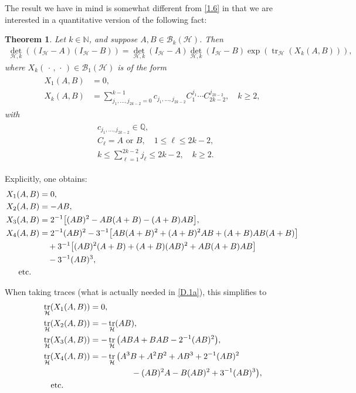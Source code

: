 \documentclass[reqno,10pt,centertags]{amsart}
\newcommand{\bbN}{{\mathbb{N}}}
\newcommand{\bbQ}{{\mathbb{Q}}}
\newcommand{\cB}{{\mathcal B}}
\newcommand{\cH}{{\mathcal H}}
\DeclareMathOperator{\tr}{tr}
\newcommand{\dott}{\,\cdot\,}
\newcommand{\no}{\notag}
\newcommand{\lb}{\label}
\let\geq\geqslant
\let\leq\leqslant
\numberwithin{equation}{section}
\newtheorem{theorem}{Theorem}[section]
\theoremstyle{remark}
\begin{document}
The result we have in mind is somewhat different from \eqref{1.6} in that we are interested in a quantitative version of the following fact:  

\begin{theorem} \lb{tD.1} 
Let $k \in \bbN$, and suppose $A, B \in \cB_k(\cH)$. Then
\begin{align}
{\det}_{\cH,k} ((I_{\cH} - A)(I_{\cH} - B)) = {\det}_{\cH,k} (I_{\cH} - A) {\det}_{\cH,k} (I_{\cH} - B) 
\exp(\tr_{\cH}(X_k(A,B))),     \lb{D.1a} 
\end{align}
where $X_k(\dott,\dott) \in \cB_1(\cH)$ is of the form
\begin{align} 
\begin{split} 
X_1(A,B) &= 0,  \\
X_k(A,B) &= \sum_{j_1,\dots,j_{2k-2} = 0}^{k-1} c_{j_1,\dots,j_{2k-2}} 
C_1^{j_1} \cdots C_{2k-2}^{j_{2k-2}}, \quad k \geq 2,
\end{split}
\end{align}
with 
\begin{align}
\begin{split} 
& c_{j_1,\dots,j_{2k-2}} \in \bbQ,   \\
& C_{\ell} = A \text{ or } B, \quad 1 \leq \ell \leq 2k-2,    \\
& k \leq \sum_{\ell=1}^{2k-2} j_{\ell} \leq 2k - 2, \quad k \geq 2.  
\end{split} 
\end{align}
\end{theorem} 

Explicitly, one obtains:
\begin{align}
X_1(A,B) &= 0,   \no \\
X_2(A,B) &= - AB,    \no \\
X_3(A,B) &= 2^{-1} \big[(AB)^2 - AB(A+B) - (A+B)AB\big],     \\
X_4(A,B) &= 2^{-1} (AB)^2 - 3^{-1} \big[AB(A+B)^2+(A+B)^2AB+(A+B)AB(A+B)\big]  \no \\
& \quad + 3^{-1} \big[(AB)^2(A+B)+(A+B)(AB)^2+AB(A+B)AB\big]     \no \\ 
& \quad - 3^{-1} (AB)^3, \no \\
& \hspace*{-9mm} \text{etc.}    \no 
\end{align}

When taking traces (what is actually needed in \eqref{D.1a}), this simplifies to
\begin{align}
\begin{split}
& \tr_{\cH} (X_1(A,B)) = 0,   \\
& \tr_{\cH}(X_2(A,B)) = - \tr_{\cH}(AB),    \\
& \tr_{\cH}(X_3(A,B)) = - \tr_{\cH}\big(ABA + BAB - 2^{-1} (AB)^2\big),     \\
& \tr_{\cH}(X_4(A,B)) = - \tr_{\cH}\big(A^3 B + A^2 B^2 + A B^3 + 2^{-1} (AB)^2    \\
& \hspace*{3.8cm} - (AB)^2A - B(AB)^2 + 3^{-1} (AB)^3\big),    \\
& \quad \text{etc.}
\end{split} 
\end{align}
\end{document}
